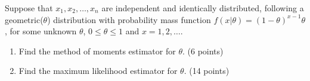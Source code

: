 \item Suppose that $x_1, x_2, \ldots, x_n$ are independent and identically distributed, following a geometric($\theta$) distribution with probability mass function $f(x|\theta)=(1-\theta)^{x-1}\theta$, for some unknown $\theta$, $0\leq\theta\leq1$ and $x=1,2,\ldots$.

\begin{enumerate}
\item Find the method of moments estimator for $\theta$. (6 points) \\
\vfill


\item Find the maximum likelihood estimator for $\theta$. (14 points) \\
\vfill

\end{enumerate}